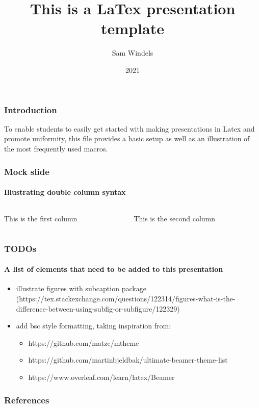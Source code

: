 \documentclass{beamer}
\title{This is a LaTex presentation template }
\author{Sam Windels}
\institute{College of Lore}
\date{2021}
\begin{document}
\frame{\titlepage}

\begin{frame}
\frametitle{Introduction}

To enable students to easily get started with making presentations in Latex and
promote uniformity, this file provides a basic setup as well as an illustration
of the most frequently used macros.  

\end{frame}


\begin{frame}[t]
	\frametitle{Mock slide}
	\framesubtitle{Illustrating double column syntax}
	\begin{columns}
		\begin{column}{0.5\textwidth}
			This is the first column
		\end{column}
		\begin{column}{0.5\textwidth}
			This is the second column
		\end{column}
	\end{columns}
\end{frame}

\begin{frame}[t]
	\frametitle{TODOs}
	\framesubtitle{A list of elements that need to be added to this presentation}
	\begin{itemize}
		\item illustrate figures with subcaption package (https://tex.stackexchange.com/questions/122314/figures-what-is-the-difference-between-using-subfig-or-subfigure/122329)
		\item add bsc style formatting, taking inspiration from:
			\begin{itemize}
				\item https://github.com/matze/mtheme
				\item https://github.com/martinbjeldbak/ultimate-beamer-theme-list
				\item https://www.overleaf.com/learn/latex/Beamer 
			\end{itemize}

	\end{itemize}
\end{frame}

\begin{frame}[t, allowframebreaks] %
	\frametitle{References}
	
\end{frame}
\end{document}
